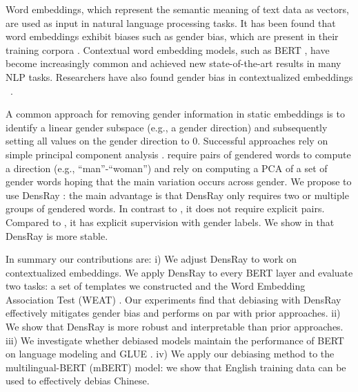 Word embeddings, which represent the semantic meaning of
text data as vectors, are used as input in natural language
processing tasks. It has been found that word embeddings
exhibit biases such as gender bias, which are present in their training
corpora \cite{bolukbasi2016man,caliskan2017semantics,garg2018word}. Contextual word
embedding models, such as BERT \cite{devlin2018bert}, have
become increasingly common and achieved new state-of-the-art
results in many NLP tasks. Researchers have also found
gender bias in contextualized
embeddings ~\cite{zhao2019gender,may2019measuring}.

A common approach for removing gender information in static
embeddings is to identify a linear gender subspace (e.g., a
gender direction) and subsequently setting all values on the
gender direction to 0. Successful approaches rely on simple
principal component
analysis \cite{bolukbasi2016man,mu2018all}. \cite{bolukbasi2016man}
require pairs of gendered words to compute a direction
(e.g., ``man''-``woman'') and \cite{mu2018all} rely on
computing a PCA of a set of gender words hoping that the
main variation occurs across gender. We propose to use
DensRay \cite{dufter2019analytical}: the main advantage is
that DensRay only requires two or multiple groups of
gendered words. In contrast to \cite{bolukbasi2016man}, it
does not require explicit pairs. Compared
to \cite{mu2018all}, it has explicit supervision with gender
labels. We show in  that
DensRay is more stable.

In summary our contributions are: i) We adjust DensRay to
 work on contextualized embeddings.  We apply DensRay to
 every BERT layer and evaluate two tasks: a set of templates
 we constructed and the Word Embedding Association Test
 (WEAT) . Our experiments find
 that debiasing with DensRay effectively mitigates gender
 bias and performs on par with prior approaches. ii) We
 show that DensRay is more robust and interpretable than
 prior approaches.  iii) We investigate whether debiased
 models maintain the performance of BERT on language
 modeling and  GLUE  . iv) We
 apply our debiasing method to the multilingual-BERT (mBERT)
 model: we show that English training data can be used to
 effectively debias Chinese.

